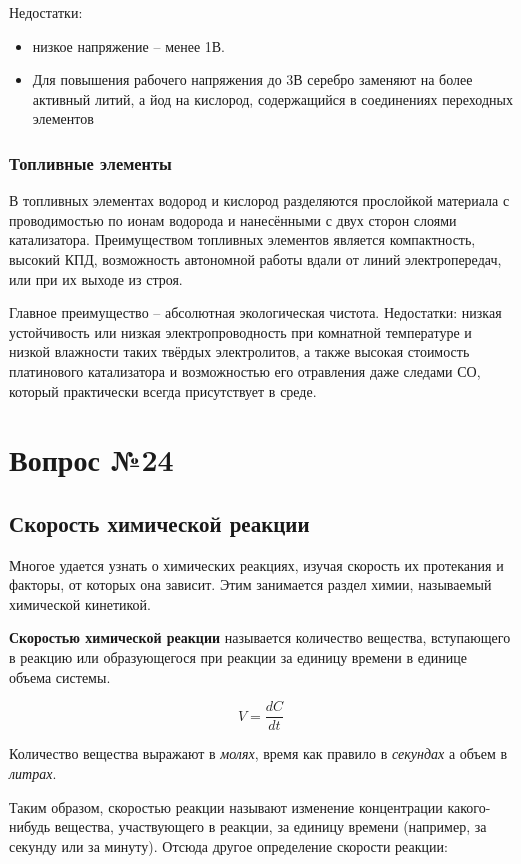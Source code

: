 \documentclass[14pt,a4paper]{scrartcl}
\begin{document}
 Недостатки:
 \begin{itemize}
 \item низкое напряжение – менее 1В. 
 \item Для повышения рабочего напряжения до 3В серебро заменяют на более активный литий, а йод на кислород, содержащийся в соединениях переходных элементов
 \end{itemize}
 \subsubsection*{Топливные элементы}

В топливных элементах водород и кислород разделяются прослойкой материала с проводимостью по ионам водорода и нанесёнными с двух сторон слоями катализатора. Преимуществом топливных элементов является компактность, высокий КПД, возможность автономной работы вдали от линий электропередач, или при их выходе из строя. 

Главное преимущество – абсолютная экологическая чистота. Недостатки: низкая устойчивость или низкая электропроводность при комнатной температуре и низкой влажности таких твёрдых электролитов, а также высокая стоимость платинового катализатора и возможностью его отравления даже следами СО, который практически всегда присутствует в среде.

\section*{Вопрос №24}

\subsection*{Скорость химической реакции}

Многое удается узнать о химических реакциях, изучая скорость их протекания и факторы, от которых она зависит. Этим занимается раздел химии, называемый химической кинетикой.

\textbf{Скоростью химической реакции} называется количество вещества, вступающего в реакцию или образующегося при реакции за единицу времени в единице объема системы.

$$V = \frac {dC}{dt}$$

Количество вещества выражают в \emph{молях}, время как правило в \emph{секундах} а объем в \emph{литрах}.

Таким образом, скоростью реакции называют изменение концентрации какого-нибудь вещества, участвующего в реакции, за единицу времени (например, за секунду или за минуту). Отсюда другое определение скорости реакции:
\end{document}
